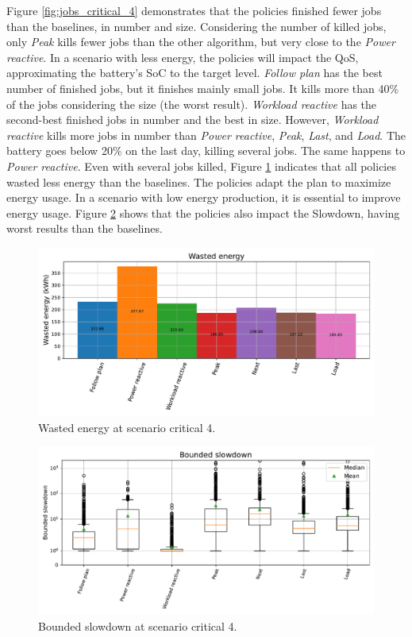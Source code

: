 Figure \ref{fig:jobs_critical_4} demonstrates that the policies finished fewer jobs than the baselines, in number and size. Considering the number of killed jobs, only \emph{Peak} kills fewer jobs than the other algorithm, but very close to the \emph{Power reactive}. In a scenario with less energy, the policies will impact the QoS, approximating the battery's SoC to the target level. \emph{Follow plan} has the best number of finished jobs, but it finishes mainly small jobs. It kills more than 40\% of the jobs considering the size (the worst result). \emph{Workload reactive} has the second-best finished jobs in number and the best in size. However, \emph{Workload reactive} kills more jobs in number than \emph{Power reactive}, \emph{Peak}, \emph{Last}, and \emph{Load}. The battery goes below 20\% on the last day, killing several jobs. The same happens to \emph{Power reactive}. Even with several jobs killed, Figure \ref{fig:energy_critical_4} indicates that all policies wasted less energy than the baselines. The policies adapt the plan to maximize energy usage. In a scenario with low energy production, it is essential to improve energy usage. Figure \ref{fig:slowdown_critical_4} shows that the policies also impact the Slowdown, having worst results than the baselines. 

\begin{figure}[!htb]
    \centering
    \includegraphics[scale=0.55]{Images/Compensations/energy_critical_4.pdf}
    \caption{Wasted energy at scenario critical 4.}
    \label{fig:energy_critical_4}
\end{figure}

\begin{figure}[!htb]
    \centering
    \includegraphics[scale=0.55]{Images/Compensations/slowdown_critical_4.pdf}
    \caption{Bounded slowdown at scenario critical 4.}
    \label{fig:slowdown_critical_4}
\end{figure}

